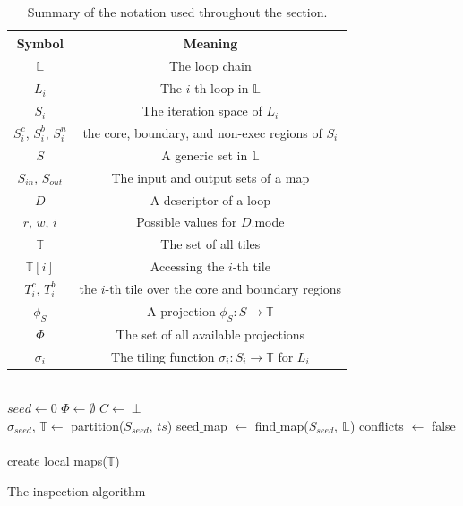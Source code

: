 \begin{table}
\centering
\begin{tabulary}{1.0\columnwidth}{C|C}
\hline
Symbol & Meaning \\
\hline
$\mathbb{L}$ & The loop chain \\
$L_i$ & The $i$-th loop in $\mathbb{L}$ \\ 
$S_i$ & The iteration space of $L_i$ \\
$S_i^{c}$, $S_i^{b}$, $S_i^{n}$ & the core, boundary, and non-exec regions of $S_i$ \\ 
$S$ & A generic set in $\mathbb{L}$ \\
$S_{in}$, $S_{out}$ & The input and output sets of a map \\
$D$ & A descriptor of a loop \\
$r$, $w$, $i$ & Possible values for $D$.mode \\
$\mathbb{T}$ & The set of all tiles \\
$\mathbb{T}[i]$ & Accessing the $i$-th tile \\
$T_i^{c}$, $T_i^{b}$ & the $i$-th tile over the core and boundary regions \\
$\phi_S$ & A projection $\phi_S : S \rightarrow \mathbb{T}$ \\
$\Phi$ & The set of all available projections \\
$\sigma_i$ & The tiling function $\sigma_i : S_i \rightarrow \mathbb{T}$ for $L_i$ \\
\hline
\end{tabulary}
\caption{Summary of the notation used throughout the section.}
\label{table:st-summary-notation}
\end{table}

\setcounter{algocf}{0}%
\begin{algorithm}[t]
\nonl ~\\
$seed \gets 0$\;
$\Phi \gets \emptyset$\;
$C \gets \perp$\;
\nonl ~\\
$\sigma_{seed}$, $\mathbb{T} \gets$ partition($S_{seed}$, $ts$)\;
seed$\_$map $\gets$ find$\_$map($S_{seed},\ \mathbb{L}$)\;
conflicts $\gets$ false\;
\nonl ~\\
create$\_$local$\_$maps($\mathbb{T}$)\;
\caption{The inspection algorithm}
\label{algo:st-inspector}
\end{algorithm}




